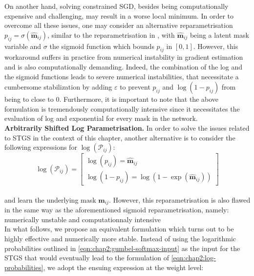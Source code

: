 On another hand, solving constrained SGD, besides being computationally
expensive and challenging, may result in a worse local minimum. In order to
overcome all these issues, one may consider an alternative reparametrisation
$p_{ij}=\sigma(\bm{\hat{m}}_{ij})$, similar to the reparametrisation in
\cite{DBLP:conf/nips/ZhouLLY19}, with $\bm{\hat{m}}_{ij}$ being a latent mask
variable and $\sigma$ the sigmoid function which bounds $p_{ij}$ in $[0,1]$.
However, this workaround suffers in practice from numerical instability in
gradient estimation and is also computationally demanding. Indeed, the
combination of the log and the sigmoid functions leads to severe numerical
instabilities, that necessitate a cumbersome stabilization by adding
$\varepsilon$ to prevent $p_{ij}$ and $\log(1-p_{ij})$ from being to close to 0.
Furthermore, it is important to note that the above formulation is tremendously
computationally intensive since it necessitates the evaluation of log and
exponential for every mask in the network.\\


\noindent\textbf{Arbitrarily Shifted Log Parametrisation.} In order to solve the
issues related to \ac{STGS} in the context of this chapter, another alternative
is to consider the following expressions for $\log(\mathcal{P}_{ij})$:\\

\begin{equation}
  \label{eqn:chap2:log-probabilities}
  \log(\mathcal{P}_{ij}) =
  \begin{bmatrix}
      \log(p_{ij}) = \bm{\hat{m}}_{ij} \\
      \log(1-p_{ij}) = \log(1-\exp(\bm{\hat{m}}_{ij}))
  \end{bmatrix} 
\end{equation}\\

\noindent and learn the underlying mask $\bm{\hat{m}}_{ij}$. However, this
reparametrisation is also flawed in the same way as the aforementioned sigmoid
reparametrisation, namely: numerically unstable and computationnaly intensive\\

In what follows, we propose an equivalent formulation which turns out to be
highly effective and numerically more stable.  Instead of using the logarithmic
probabilities outlined in \cref{eqn:chap2:gumbel-softmax-input} as the input for
the \ac{STGS} that would eventually lead to the formulation of
\cref{eqn:chap2:log-probabilities}, we adopt the ensuing expression at the
weight level:\\

